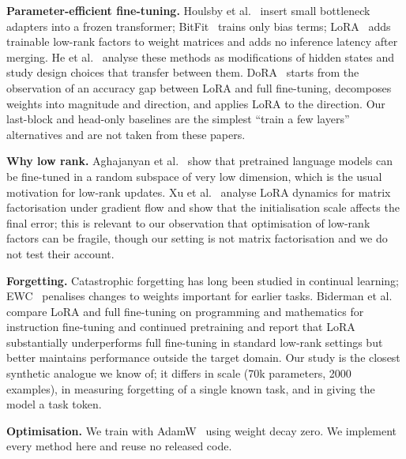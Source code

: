 \textbf{Parameter-efficient fine-tuning.} Houlsby et al.~\cite{houlsby2019parameter} insert small bottleneck adapters into a frozen transformer; BitFit~\cite{benzaken2021bitfit} trains only bias terms; LoRA~\cite{hu2021lora} adds trainable low-rank factors to weight matrices and adds no inference latency after merging. He et al.~\cite{he2021unified} analyse these methods as modifications of hidden states and study design choices that transfer between them. DoRA~\cite{liu2024dora} starts from the observation of an accuracy gap between LoRA and full fine-tuning, decomposes weights into magnitude and direction, and applies LoRA to the direction. Our last-block and head-only baselines are the simplest ``train a few layers'' alternatives and are not taken from these papers.

\textbf{Why low rank.} Aghajanyan et al.~\cite{aghajanyan2020intrinsic} show that pretrained language models can be fine-tuned in a random subspace of very low dimension, which is the usual motivation for low-rank updates. Xu et al.~\cite{xu2025understanding} analyse LoRA dynamics for matrix factorisation under gradient flow and show that the initialisation scale affects the final error; this is relevant to our observation that optimisation of low-rank factors can be fragile, though our setting is not matrix factorisation and we do not test their account.

\textbf{Forgetting.} Catastrophic forgetting has long been studied in continual learning; EWC~\cite{kirkpatrick2016overcoming} penalises changes to weights important for earlier tasks. Biderman et al.~\cite{biderman2024lora} compare LoRA and full fine-tuning on programming and mathematics for instruction fine-tuning and continued pretraining and report that LoRA substantially underperforms full fine-tuning in standard low-rank settings but better maintains performance outside the target domain. Our study is the closest synthetic analogue we know of; it differs in scale (70k parameters, 2000 examples), in measuring forgetting of a single known task, and in giving the model a task token.

\textbf{Optimisation.} We train with AdamW~\cite{loshchilov2017decoupled} using weight decay zero. We implement every method here and reuse no released code.
